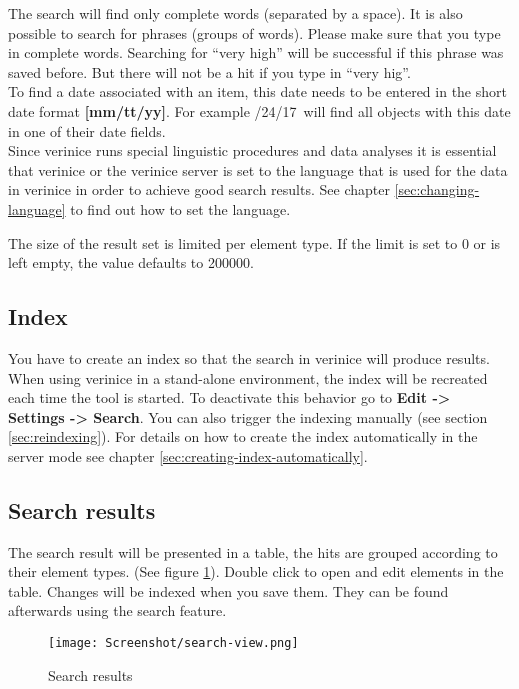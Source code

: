 \documentclass[a4paper,10pt]{book}
\begin{document}
The search will find only complete words (separated by a space). It is
also possible to search for phrases (groups of words). Please make
sure that you type in complete words. Searching for ``very high'' will
be successful if this phrase was saved before. But there will not
be a hit if you type in ``very hig''.\\

To find a date associated with an item, this date needs to be entered 
in the short date format \textbf{[mm/tt/yy]}.
For example /24/17\grqq\ will find all objects with this
date in one of their date fields.\\

Since verinice runs special linguistic procedures and data analyses it
is essential that verinice or the verinice server is set to the
language that is used for the data in verinice in order to achieve
good search results. See chapter \ref{sec:changing-language} to find
out how to set the language.

The size of the result set is limited per element type. If the limit
is set to 0 or is left empty, the value defaults to 200000.
\subsection{Index}
\label{sec:index}

You have to create an index so that the search in verinice will
produce results.  When using verinice in a stand-alone environment,
the index will be recreated each time the tool is started. To
deactivate this behavior go to \textbf{Edit -> Settings ->
  Search}. You can also trigger the indexing manually (see section
\ref{sec:reindexing}). For details on how to create the index
automatically in the server mode see
chapter \ref{sec:creating-index-automatically}.

\subsection{Search results}
\label{sec:search-results}

The search result will be presented in a table, the hits are grouped
according to their element types. (See figure
\ref{fig:search-view}). Double click to open and edit elements in the
table. Changes will be indexed when you save them. They can be found
afterwards using the search feature.\\

\begin{figure}[ht]
  \centering
  \texttt{[image: Screenshot/search-view.png]}
  \caption{Search results}
  \label{fig:search-view}
\end{figure}
\end{document}
